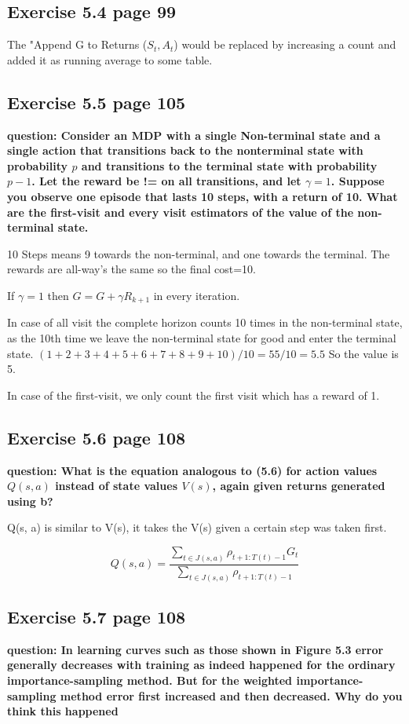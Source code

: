 \subsection{Exercise 5.4 page 99}
The "Append G to Returns ($S_{t} , A_{t}$) would be replaced by increasing a count and added it as running average to some table.

\subsection{Exercise 5.5 page 105}
\textbf{question: Consider an MDP with a single Non-terminal state and a single action that transitions back to the nonterminal state with probability $p$ and transitions to the terminal state with probability $p-1$. Let the reward be != on all transitions, and let $\gamma = 1$. Suppose you observe one episode that lasts 10 steps, with a return of 10. What are the first-visit and every visit estimators of the value of the non-terminal state. }

10 Steps means 9 towards the non-terminal, and one towards the terminal. The rewards are all-way's the same so the final cost=10. 

If $\gamma = 1$ then $G=G+\gamma R_{k+1}$ in every iteration. 

In case of all visit the complete horizon counts 10 times in the non-terminal state, as the 10th time we leave the non-terminal state for good and enter the terminal state. $(1+2+3+4+5+6+7+8+9+10)/10 = 55/10 = 5.5$ So the value is 5.

In case of the first-visit, we only count the first visit which has a reward of 1.

\subsection{Exercise 5.6 page 108}
\textbf{question: What is the equation analogous to (5.6) for action values $Q(s,a)$ instead of state values $V(s)$, again given returns generated using b?}

Q(s, a) is similar to V(s), it takes the V(s) given a certain step was taken first.

\begin{equation}
Q(s, a) = \frac{\sum_{t \in J(s,a)} \rho_{t+1:T(t)-1} G_t }{\sum_{t \in J(s,a)} \rho_{t+1:T(t)-1}}
\end{equation}

\subsection{Exercise 5.7 page 108}
\textbf{question: In learning curves such as those shown in Figure 5.3 error generally decreases with training as indeed happened for the ordinary importance-sampling method. But for the weighted importance-sampling method error first increased and then decreased. Why do you think this happened}

